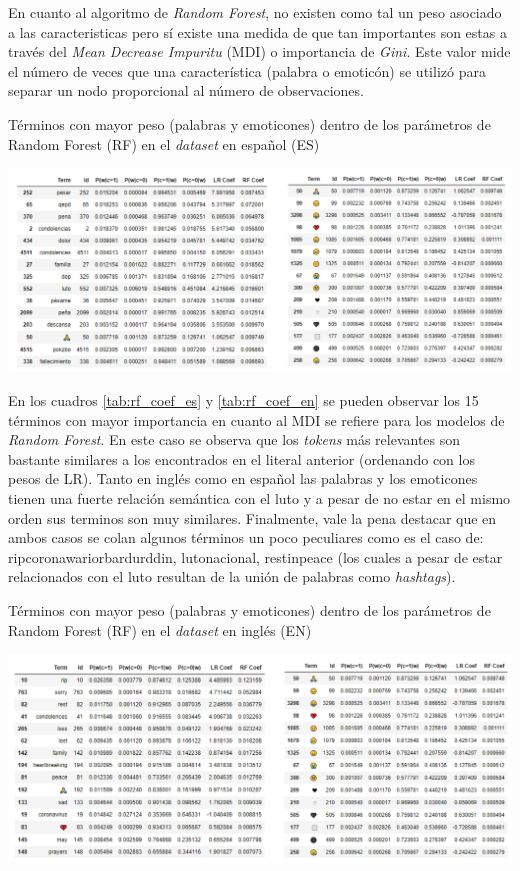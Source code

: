 En cuanto al algoritmo de \textit{Random Forest}, no existen como tal un peso asociado a las caracteristicas pero sí existe una medida de que tan importantes son estas a través del \textit{Mean Decrease Impuritu} (MDI) o importancia de \textit{Gini}. Este valor mide el número de veces que una característica (palabra o emoticón) se utilizó para separar un nodo proporcional al número de observaciones.

\begin{table}[H]
    \centering
    \caption{Términos con mayor peso (palabras y emoticones) dentro de los parámetros de Random Forest (RF) en el \textit{dataset} en español (ES)}
    \label{tab:rf_coef_es}
    \includegraphics[width=\textwidth]{doc/images/RF_Coef_es.png}
\end{table}

En los cuadros \ref{tab:rf_coef_es} y \ref{tab:rf_coef_en} se pueden observar los 15 términos con mayor importancia en cuanto al MDI se refiere para los modelos de \textit{Random Forest}. En este caso se observa que los \textit{tokens} más relevantes son bastante similares a los encontrados en el literal anterior (ordenando con los pesos de LR). Tanto en inglés como en español las palabras y los emoticones tienen una fuerte relación semántica con el luto y a pesar de no estar en el mismo orden sus terminos son muy similares. Finalmente, vale la pena destacar que en ambos casos se colan algunos términos un poco peculiares como es el caso de: ripcoronawariorbardurddin, lutonacional, restinpeace (los cuales a pesar de estar relacionados con el luto resultan de la unión de palabras como \textit{hashtags}).

\begin{table}[H]
    \centering
    \caption{Términos con mayor peso (palabras y emoticones) dentro de los parámetros de Random Forest (RF) en el \textit{dataset} en inglés (EN)}
    \label{tab:rf_coef_en}
    \includegraphics[width=\textwidth]{doc/images/RF_Coef_en.png}
\end{table}